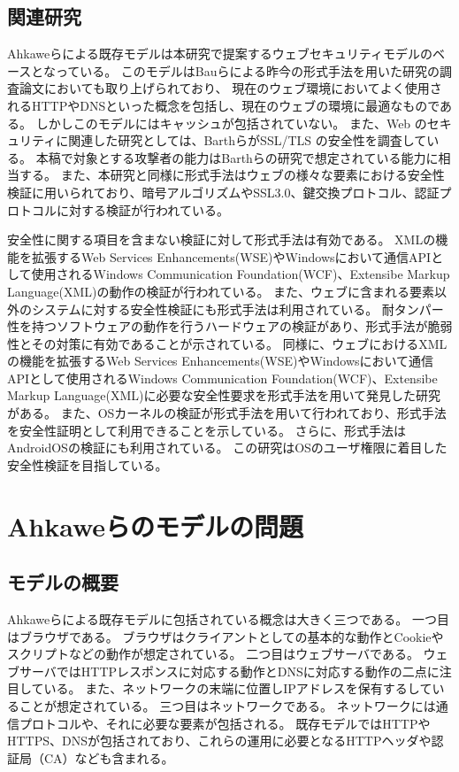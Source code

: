 \documentclass{css}
\begin{document}
\subsection{関連研究}
Ahkaweらによる既存モデル\cite{webmodel}は本研究で提案するウェブセキュリティモデルのベースとなっている。
このモデルはBauらによる昨今の形式手法を用いた研究の調査論文\cite{security_modeling_and_analysis}においても取り上げられており、
現在のウェブ環境においてよく使用されるHTTPやDNSといった概念を包括し、現在のウェブの環境に最適なものである。
しかしこのモデルにはキャッシュが包括されていない。
また、Web のセキュリティに関連した研究としては、Barthら\cite{securing_frame_communication_in_browsers}がSSL/TLS の安全性を調査している。
本稿で対象とする攻撃者の能力はBarthらの研究で想定されている能力に相当する。
\color{red}
また、本研究と同様に形式手法はウェブの様々な要素における安全性検証に用いられており、暗号アルゴリズムやSSL3.0、鍵交換プロトコル、認証プロトコルに対する検証が行われている\cite{TFFWS17,TFFWS18,TFFWS19,TFFWS20}。

安全性に関する項目を含まない検証に対して形式手法は有効である。
XMLの機能を拡張するWeb Services Enhancements(WSE)やWindowsにおいて通信APIとして使用されるWindows Communication Foundation(WCF)、Extensibe Markup Language(XML)の動作の検証\cite{TFFWS27,TFFWS28}が行われている。
また、ウェブに含まれる要素以外のシステムに対する安全性検証にも形式手法は利用されている。
耐タンパー性を持つソフトウェアの動作を行うハードウェアの検証\cite{specifying_and_verifying_hardware_for}があり、形式手法が脆弱性とその対策に有効であることが示されている。
同様に、ウェブにおけるXMLの機能を拡張するWeb Services Enhancements(WSE)やWindowsにおいて通信APIとして使用されるWindows Communication Foundation(WCF)、Extensibe Markup Language(XML)に必要な安全性要求を形式手法を用いて発見した研究\cite{TFFWS27,TFFWS28}がある。
また、OSカーネルの検証\cite{sel4_formal_verification_of_an}が形式手法を用いて行われており、形式手法を安全性証明として利用できることを示している。
さらに、形式手法はAndroidOSの検証\cite{towards_formal_analysis_of_the}にも利用されている。
この研究はOSのユーザ権限に着目した安全性検証を目指している。
\color{black}

\section{Ahkaweらのモデルの問題}

\subsection{モデルの概要}
\label{sec:existingmodel}
Ahkaweらによる既存モデル\cite{webmodel}に包括されている概念は大きく三つである。
一つ目はブラウザである。
ブラウザはクライアントとしての基本的な動作とCookieやスクリプトなどの動作が想定されている。
二つ目はウェブサーバである。
ウェブサーバではHTTPレスポンスに対応する動作とDNSに対応する動作の二点に注目している。
また、ネットワークの末端に位置しIPアドレスを保有するしていることが想定されている。
三つ目はネットワークである。
ネットワークには通信プロトコルや、それに必要な要素が包括される。
既存モデルではHTTPやHTTPS、DNSが包括されており、これらの運用に必要となるHTTPヘッダや認証局（CA）なども含まれる。
\end{document}
